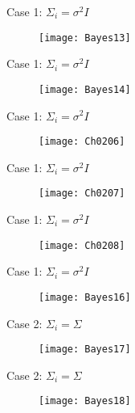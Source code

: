 \begin{frame}{Case 1: $\Sigma_i=\sigma^2 I$}
\begin{figure}
\texttt{[image: Bayes13]}
\end{figure}
\end{frame}

\begin{frame}{Case 1: $\Sigma_i=\sigma^2 I$}
\begin{figure}
\texttt{[image: Bayes14]}
\end{figure}
\end{frame}


\begin{frame}{Case 1: $\Sigma_i=\sigma^2 I$}
\begin{figure}
\texttt{[image: Ch0206]}
\end{figure}
\end{frame}




\begin{frame}{Case 1: $\Sigma_i=\sigma^2 I$}
\begin{figure}
\texttt{[image: Ch0207]}
\end{figure}
\end{frame}

\begin{frame}{Case 1: $\Sigma_i=\sigma^2 I$}
\begin{figure}
\texttt{[image: Ch0208]}
\end{figure}
\end{frame}

\begin{frame}{Case 1: $\Sigma_i=\sigma^2 I$}
\begin{figure}
\texttt{[image: Bayes16]}
\end{figure}
\end{frame}

\begin{frame}{Case 2: $\Sigma_i=\Sigma$}
\begin{figure}
\texttt{[image: Bayes17]}
\end{figure}
\end{frame}

\begin{frame}{Case 2: $\Sigma_i=\Sigma$}
\begin{figure}
\texttt{[image: Bayes18]}
\end{figure}
\end{frame}


